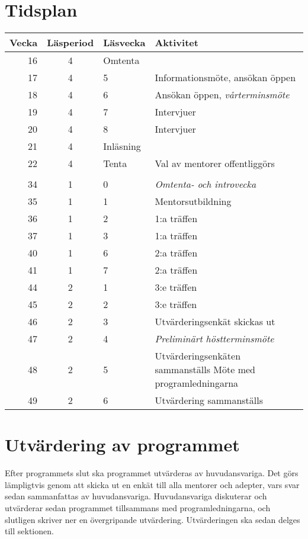 \documentclass[10pt]{article}
\begin{document}
    \section{Tidsplan}
    \begin{tabularx}{\textwidth}{rclX}
        \textbf{Vecka} & \textbf{Läsperiod} & \textbf{Läsvecka} & \textbf{Aktivitet} \\
        \hline
        16 & 4 & Omtenta & \\
        17 & 4 & 5 & Informationsmöte, ansökan öppen \\
        18 & 4 & 6 & Ansökan öppen, \emph{vårterminsmöte} \\
        19 & 4 & 7 & Intervjuer \\
        20 & 4 & 8 & Intervjuer \\
        21 & 4 & Inläsning & \\
        22 & 4 & Tenta & Val av mentorer offentliggörs \\
        \\
        34 & 1 & 0 & \emph{Omtenta- och introvecka} \\
        35 & 1 & 1 & Mentorsutbildning \\
        36 & 1 & 2 & 1:a träffen \\
        37 & 1 & 3 & 1:a träffen \\
        40 & 1 & 6 & 2:a träffen \\
        41 & 1 & 7 & 2:a träffen \\
        44 & 2 & 1 & 3:e träffen \\
        45 & 2 & 2 & 3:e träffen \\
        46 & 2 & 3 & Utvärderingsenkät skickas ut \\
        47 & 2 & 4 & \emph{Preliminärt höstterminsmöte} \\
        48 & 2 & 5 & Utvärderingsenkäten sammanställs \newline
                     Möte med programledningarna \\
        49 & 2 & 6 & Utvärdering sammanställs \\
    \end{tabularx}

    \newpage

    \section{Utvärdering av programmet}
    Efter programmets slut ska programmet utvärderas av huvudansvariga.
    Det görs lämpligtvis genom att skicka ut en enkät till alla mentorer och adepter, vars svar sedan sammanfattas av huvudansvariga.
    Huvudansvariga diskuterar och utvärderar sedan programmet tillsammans med programledningarna, och slutligen skriver ner en övergripande utvärdering.
    Utvärderingen ska sedan delges till sektionen.
\end{document}
